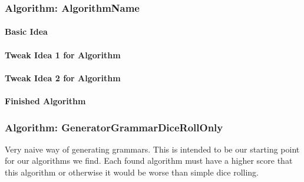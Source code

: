 \pagebreak

\subsubsection{Algorithm: AlgorithmName}

\paragraph{Basic Idea}

\paragraph{Tweak Idea 1 for Algorithm}

\paragraph{Tweak Idea 2 for Algorithm}

\paragraph{Finished Algorithm}



\pagebreak

\subsubsection{Algorithm: GeneratorGrammarDiceRollOnly}
\noindent Very naive way of generating grammars. This is intended to be our starting point for our algorithms we find. Each found algorithm must have a higher score that this algorithm or otherwise it would be worse than simple dice rolling. \\


